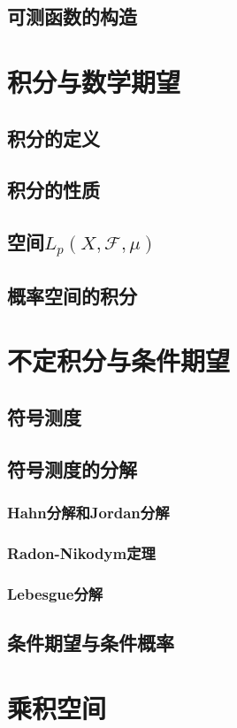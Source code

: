 \section{可测函数的构造}

\chapter{积分与数学期望}
\section{积分的定义}
\section{积分的性质}
\section{空间$L_p(X,\mathscr{F},\mu)$}
\section{概率空间的积分}


\chapter{不定积分与条件期望}
\section{符号测度}
\section{符号测度的分解}
	\subsection{Hahn分解和Jordan分解}
	\subsection{Radon-Nikodym定理}
	\subsection{Lebesgue分解}
\section{条件期望与条件概率}

\chapter{乘积空间}
